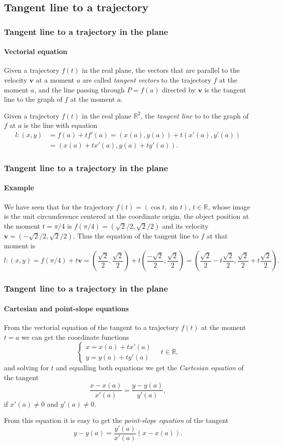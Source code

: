 \subsection{Tangent line to a trajectory}
\begin{frame}
\frametitle{Tangent line to a trajectory in the plane}
\framesubtitle{Vectorial equation}
Given a trajectory $f(t)$ in the real plane, the vectors that are parallel to the velocity $\mathbf{v}$ at a moment $a$ are called \emph{tangent vectors} to the trajectory $f$ at the moment $a$, and the line passing through $P=f(a)$ directed by $\mathbf{v}$ is the tangent line to the graph of $f$ at the moment $a$.

\begin{definition}
Given a trajectory $f(t)$ in the real plane $\mathbb{R}^2$, the \emph{tangent line} to to the graph of $f$ at $a$ is the line with equation
\begin{align*}
l:(x,y) &= f(a)+tf'(a) = (x(a),y(a))+t(x'(a),y'(a))\\
& = (x(a)+tx'(a),y(a)+ty'(a)).
\end{align*}
\end{definition}
\end{frame}


\begin{frame}
\frametitle{Tangent line to a trajectory in the plane}
\framesubtitle{Example}
We have seen that for the trajectory $f(t) = (\cos t,\sin t)$, $t\in \mathbb{R}$, whose image is the unit circumference centered at the coordinate origin, the object position at the moment $t=\pi/4$ is $f(\pi/4)=(\sqrt{2}/2,\sqrt{2}/2)$ and its velocity $\mathbf{v}=(-\sqrt{2}/2,\sqrt{2}/2)$. 
Thus the equation of the tangent line to $f$ at that moment is 
\[
l: (x,y) = f(\pi/4)+t\mathbf{v} =
\left(\frac{\sqrt{2}}{2},\frac{\sqrt{2}}{2}\right)+t\left(\frac{-\sqrt{2}}{2},\frac{\sqrt{2}}{2}\right) =
\left(\frac{\sqrt{2}}{2}-t\frac{\sqrt{2}}{2},\frac{\sqrt{2}}{2}+t\frac{\sqrt{2}}{2}\right).
\]
\end{frame}


\begin{frame}
\frametitle{Tangent line to a trajectory in the plane}
\framesubtitle{Cartesian and point-slope equations}
From the vectorial equation of the tangent to a trajectory $f(t)$ at the moment $t=a$ we can get the coordinate functions
\[
\begin{cases}
x=x(a)+tx'(a)\\
y=y(a)+ty'(a)
\end{cases}
\quad t\in \mathbb{R},
\]
and solving for $t$ and equalling both equations we get the \emph{Cartesian equation} of the tangent
\[
\frac{x-x(a)}{x'(a)}=\frac{y-y(a)}{y'(a)},
\]
if $x'(a)\neq 0$ and $y'(a)\neq 0$.

From this equation it is easy to get the \emph{point-slope equation} of the tangent
\[
y-y(a)=\frac{y'(a)}{x'(a)}(x-x(a)).
\]
\end{frame}


